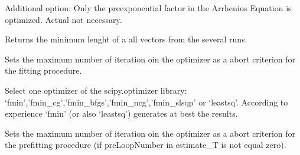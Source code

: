\documentclass[letterpaper,10pt,english]{sphinxmanual}
\begin{document}
\begin{fulllineitems}
\begin{fulllineitems}
\end{fulllineitems}


\begin{fulllineitems}
\label{FittingClasses:Fitter.LeastSquarsEstimator.improve_a}
Additional option: Only the preexponential factor in the Arrhenius Equation is optimized. Actual not necessary.

\end{fulllineitems}


\begin{fulllineitems}
\label{FittingClasses:Fitter.LeastSquarsEstimator.minLengthOfVectors}
Returns the minimum lenght of a all vectors from the several runs.

\end{fulllineitems}


\begin{fulllineitems}
\label{FittingClasses:Fitter.LeastSquarsEstimator.setMaxIter}
Sets the maximum number of iteration oin the optimizer as a abort criterion for the fitting procedure.

\end{fulllineitems}


\begin{fulllineitems}
\label{FittingClasses:Fitter.LeastSquarsEstimator.setOptimizer}
Select one optimizer of the scipy.optimizer library: `fmin','fmin\_cg','fmin\_bfgs','fmin\_ncg','fmin\_slsqp' or `leastsq'. According to experience `fmin' (or also `leastsq') generates at best the results.

\end{fulllineitems}


\begin{fulllineitems}
\label{FittingClasses:Fitter.LeastSquarsEstimator.setPreMaxIter}
Sets the maximum number of iteration oin the optimizer as a abort criterion for the prefitting procedure (if preLoopNumber in estimate\_T is not equal zero).


\end{fulllineitems}
\end{fulllineitems}
\end{document}
